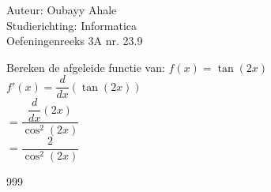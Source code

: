 \documentclass[a4paper]{article}
\begin{document}
  
\noindent \large Auteur: Oubayy Ahale          \\
\noindent \large Studierichting: Informatica   \\
\noindent \large Oefeningenreeks 3A nr. 23.9   \\

\medskip

\normalsize

Bereken de afgeleide functie van: $ f(x) = \tan(2x) $\\

$ f'(x) = \dfrac{d}{dx} \left( \tan(2x) \right) $\\

$ = \dfrac{\dfrac{d}{dx} (2x)}{\cos^2(2x)} $\\

$ = \dfrac{2}{\cos^2(2x)} $\\


\begin{thebibliography}{999}
\end{thebibliography}
\end{document}
